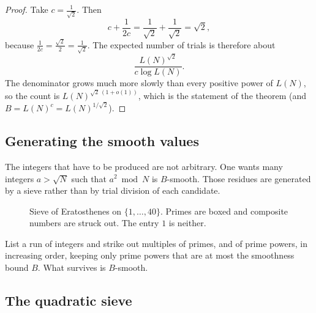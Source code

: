 \begin{proof}
Take \(c=\frac1{\sqrt{2}}\). Then
\[
    c+\frac1{2c}
    =\frac1{\sqrt{2}}+\frac1{\sqrt{2}}
    =\sqrt{2},
\]
because \(\frac1{2c}=\frac{\sqrt{2}}{2}=\frac1{\sqrt{2}}\). The expected
number of trials is therefore about
\[
    \frac{L(N)^{\sqrt{2}}}{c\log L(N)}.
\]
The denominator grows much more slowly than every positive power of
\(L(N)\), so the count is \(L(N)^{\sqrt{2}\,(1+o(1))}\), which is the
statement of the theorem (and \(B=L(N)^{c}=L(N)^{1/\sqrt{2}}\)).
\end{proof}

\subsection{Generating the smooth values}
\label{sec:sieving-idea}

The integers that have to be produced are not arbitrary. One wants many
integers \(a>\sqrt{N}\) such that \(a^{2}\bmod N\) is \(B\)-smooth. Those
residues are generated by a sieve rather than by trial division of each
candidate.


\begin{figure}[H]
\centering
{}
\caption{Sieve of Eratosthenes on \(\{1,\ldots,40\}\). Primes are boxed and
composite numbers are struck out. The entry \(1\) is neither.}
\end{figure}

List a run of integers and strike out multiples of primes, and of prime
powers, in increasing order, keeping only prime powers that are at most
the smoothness bound \(B\). What survives is \(B\)-smooth.

\subsection{The quadratic sieve}
\label{sec:qs}

